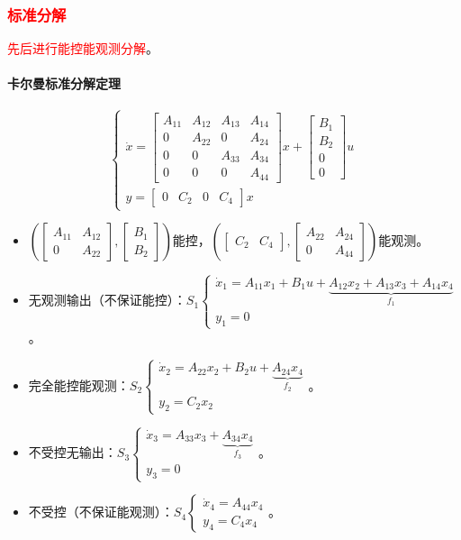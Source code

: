 \documentclass[
12pt, %
a4paper, 
oneside, %
]{scrartcl}
\begin{document}
\subsubsection[标准分解]{\textcolor{red}{标准分解}}
\textcolor{red}{先后进行能控能观测分解}。
\paragraph{卡尔曼标准分解定理}
$$ \begin{cases} \dot{x} = \begin{bmatrix} A_{11} & A_{12} & A_{13} & A_{14} \\ 0 & A_{22} & 0 & A_{24} \\ 0 & 0 & A_{33} & A_{34} \\ 0 & 0 & 0 & A_{44} \end{bmatrix} x + \begin{bmatrix} B_1 \\ B_2 \\ 0 \\ 0 \end{bmatrix} u \\ y = \begin{bmatrix} 0 & C_2 & 0 & C_4 \end{bmatrix} x \end{cases} $$
\begin{itemize}
\item $ (\begin{bmatrix} A_{11} & A_{12} \\ 0 & A_{22} \end{bmatrix}, \begin{bmatrix} B_1 \\ B_2 \end{bmatrix}) $能控，$ (\begin{bmatrix} C_2 & C_4 \end{bmatrix}, \begin{bmatrix} A_{22} & A_{24} \\ 0 & A_{44} \end{bmatrix}) $能观测。
\item 无观测输出（不保证能控）：$ S_1 \begin{cases} \dot{x}_1 = A_{11} x_1 + B_1 u + \underbrace{A_{12} x_2 + A_{13} x_3 + A_{14} x_4}_{f_1} \\ y_1 = 0 \end{cases} $。
\item 完全能控能观测：$ S_2 \begin{cases} \dot{x}_2 = A_{22} x_2 + B_2 u + \underbrace{A_{24} x_4}_{f_2} \\ y_2 = C_2 x_2 \end{cases} $。
\item 不受控无输出：$ S_3 \begin{cases} \dot{x}_3 = A_{33} x_3 + \underbrace{A_{34} x_4}_{f_3} \\ y_3 = 0 \end{cases} $。
\item 不受控（不保证能观测）：$ S_4 \begin{cases} \dot{x}_4 = A_{44} x_4 \\ y_4 = C_4 x_4 \end{cases} $。
\end{itemize}
\end{document}
